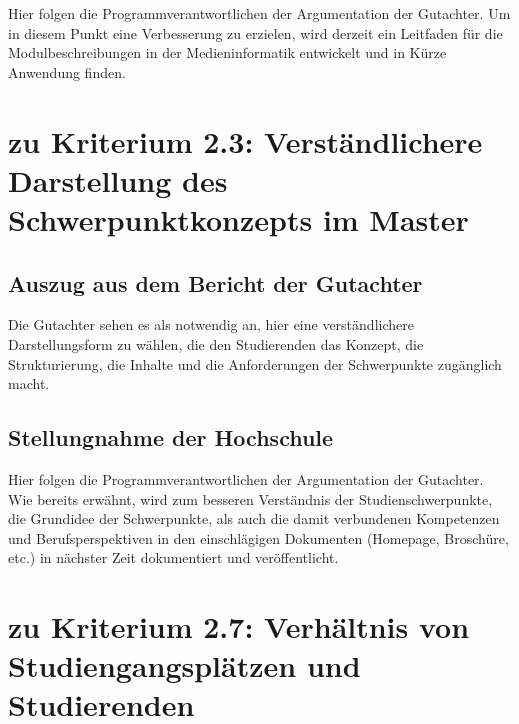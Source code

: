 Hier folgen die Programmverantwortlichen der Argumentation der
Gutachter. Um in diesem Punkt eine Verbesserung zu erzielen, wird
derzeit ein Leitfaden für die Modulbeschreibungen in der
Medieninformatik entwickelt und in Kürze Anwendung finden.

\section{zu Kriterium 2.3: Verständlichere Darstellung des
Schwerpunktkonzepts im
Master\label{/mi-2017/selbstbericht/auflagen/0000-auflagen}}\label{zu-kriterium-2.3-verstuxe4ndlichere-darstellung-des-schwerpunktkonzepts-im-masterpathlabelmi-2017selbstberichtauflagen0000-auflagen}

\subsection{Auszug aus dem Bericht der
Gutachter\label{/mi-2017/selbstbericht/auflagen/0000-auflagen}}\label{auszug-aus-dem-bericht-der-gutachterpathlabelmi-2017selbstberichtauflagen0000-auflagen-4}

\begin{siderules}
Die Gutachter sehen es als notwendig an, hier eine verständlichere
Darstellungsform zu wählen, die den Studierenden das Konzept, die
Strukturierung, die Inhalte und die Anforderungen der Schwerpunkte
zugänglich macht.
\end{siderules}

\subsection{Stellungnahme der
Hochschule\label{/mi-2017/selbstbericht/auflagen/0000-auflagen}}\label{stellungnahme-der-hochschulepathlabelmi-2017selbstberichtauflagen0000-auflagen-3}

Hier folgen die Programmverantwortlichen der Argumentation der
Gutachter. Wie bereits erwähnt, wird zum besseren Verständnis der
Studienschwerpunkte, die Grundidee der Schwerpunkte, als auch die damit
verbundenen Kompetenzen und Berufsperspektiven in den einschlägigen
Dokumenten (Homepage, Broschüre, etc.) in nächster Zeit dokumentiert und
veröffentlicht.

\section{zu Kriterium 2.7: Verhältnis von Studiengangsplätzen und
Studierenden
\label{/mi-2017/selbstbericht/auflagen/0000-auflagen}}\label{zu-kriterium-2.7-verhuxe4ltnis-von-studiengangspluxe4tzen-und-studierenden-pathlabelmi-2017selbstberichtauflagen0000-auflagen}


